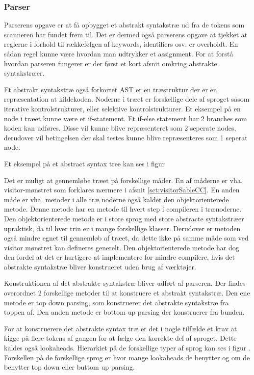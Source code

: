 \subsubsection{Parser}\wip
Parserens opgave er at få opbygget et abstrakt syntakstræ ud fra de tokens som scanneren har fundet frem til. Det er dermed også parserens opgave at tjekket at reglerne i forhold til rækkefølgen af keywords, identifiers osv. er overholdt. En sådan regel kunne være hvordan man udtrykker et assignment. For at forstå hvordan parseren fungerer er der først et kort afsnit omkring abstrakte syntakstræer.

Et abstrakt syntakstræ også forkortet AST er en træstruktur der er en repræsentation at kildekoden. Noderne i træet er forskellige dele af sproget såsom iterative kontrolstrukturer, eller selektive kontrolstrukturer. Et eksempel på en node i træet kunne være et if-statement. Et if-else statement har 2 branches som koden kan udføres. Disse vil kunne blive repræsenteret som 2 seperate nodes, derudover vil betingelsen der skal testes kunne blive repræsenteres som 1 seperat node.

\noindent Et eksempel på et abstract syntax tree kan ses i figur 

\noindent Det er muligt at gennemløbe træet på forskellige måder. En af måderne er vha. visitor-mønstret som forklares nærmere i afsnit \ref{sct:visitorSableCC}. En anden måde er vha. metoder i alle træ noderne også kaldet den objektorienterede metode. Denne metode har en metode til hvert step i compileren i trænoderne. Den objektorienterede metode er i store sprog med  store abstracte syntakstræer upraktisk, da til hver trin er i mange forskellige klasser. Derudover er metoden også mindre egnet til gennemløb af træet, da dette ikke på samme måde som ved visitor mønstret kan defineres generelt. Den objektorienterede metode har dog den fordel at det er hurtigere at implementere for mindre compilere, hvis det abstrakte syntakstræ bliver konstrueret uden brug af værktøjer.

Konstruktionen af det abstrakte syntakstræ bliver udført af parseren. Der findes overordnet 2 forskellige metoder til at konstruere et abstrakt syntakstræ. Den ene metode er top down parsing, som konstruerer det abstrakte syntakstræ fra toppen af. Den anden metode er bottom up parsing der konstruerer fra bunden.

For at konstruerere det abstrakte syntax træ er det i nogle tilfælde et krav at kigge på flere tokens af gangen for at fælge den korrekte del af sproget. Dette kaldes også lookaheads. Hierarkiet på de forskellige typer af sprog kan ses i figur . Forskellen på de forskellige sprog er hvor mange lookaheads de benytter og om de benytter top down eller buttom up parsing.


